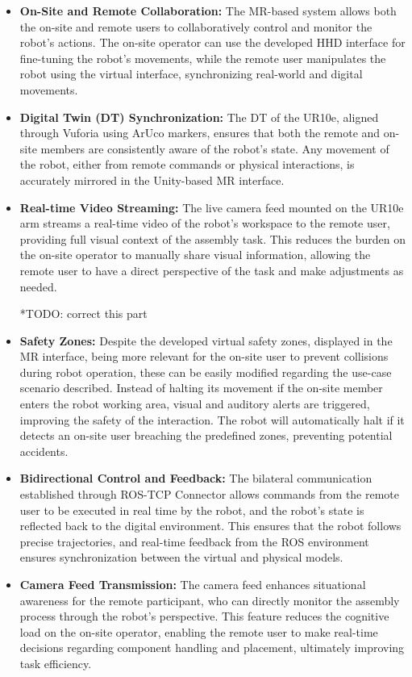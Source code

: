     \begin{itemize}
        \item \textbf{On-Site and Remote Collaboration:} The \ac{MR}-based system allows both the on-site and remote users to collaboratively control and monitor the robot’s actions. The on-site operator can use the developed \ac{HHD} interface for fine-tuning the robot’s movements, while the remote user manipulates the robot using the virtual interface, synchronizing real-world and digital movements.
        
        \item \textbf{Digital Twin (\ac{DT}) Synchronization:} The \ac{DT} of the UR10e, aligned through Vuforia using ArUco markers, ensures that both the remote and on-site members are consistently aware of the robot’s state. Any movement of the robot, either from remote commands or physical interactions, is accurately mirrored in the Unity-based \ac{MR} interface.
    
        \item \textbf{Real-time Video Streaming:} The live camera feed mounted on the UR10e arm streams a real-time video of the robot’s workspace to the remote user, providing full visual context of the assembly task. This reduces the burden on the on-site operator to manually share visual information, allowing the remote user to have a direct perspective of the task and make adjustments as needed.
    
        *TODO: correct this part 
        \item \textbf{Safety Zones:} Despite the developed virtual safety zones, displayed in the \ac{MR} interface, being more relevant for the on-site user to prevent collisions during robot operation, these can be easily modified regarding the use-case scenario described. Instead of halting its movement if the on-site member enters the robot working area, visual and auditory alerts are triggered, improving the safety of the interaction. The robot will automatically halt if it detects an on-site user breaching the predefined zones, preventing potential accidents.
    
        \item \textbf{Bidirectional Control and Feedback:} The bilateral communication established through ROS-TCP Connector allows commands from the remote user to be executed in real time by the robot, and the robot’s state is reflected back to the digital environment. This ensures that the robot follows precise trajectories, and real-time feedback from the ROS environment ensures synchronization between the virtual and physical models.
    
        \item \textbf{Camera Feed Transmission:} The camera feed enhances situational awareness for the remote participant, who can directly monitor the assembly process through the robot’s perspective. This feature reduces the cognitive load on the on-site operator, enabling the remote user to make real-time decisions regarding component handling and placement, ultimately improving task efficiency.
    
    \end{itemize}
    
